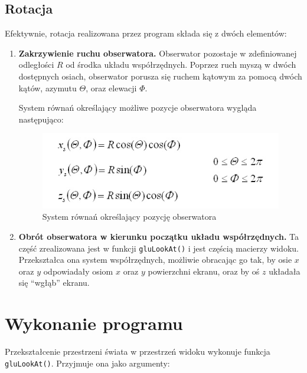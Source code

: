 \documentclass[a4paper]{article}
\begin{document}
\subsection{Rotacja}

Efektywnie, rotacja realizowana przez program składa się z dwóch elementów:

\begin{enumerate}
    \item \textbf{Zakrzywienie ruchu obserwatora.} Obserwator pozostaje w
          zdefiniowanej odległości $R$ od środka układu współrzędnych. Poprzez
          ruch myszą w dwóch dostępnych osiach, obserwator porusza się ruchem
          kątowym za pomocą dwóch kątów, azymutu $\Theta$, oraz elewacji $\Phi$.

          System równań określający możliwe pozycje obserwatora wygląda
          następująco:

          \begin{figure}[H]
              \includegraphics[width=\textwidth]{rotation-equations}
              \caption{System równań określający pozycję obserwatora}
          \end{figure}

    \item \textbf{Obrót obserwatora w kierunku początku układu współrzędnych.}
          Ta część zrealizowana jest w funkcji \verb|gluLookAt()| i jest częścią
          macierzy widoku. Przekształca ona system współrzędnych, możliwie
          obracając go tak, by osie $x$ oraz $y$ odpowiadały osiom $x$ oraz $y$
          powierzchni ekranu, oraz by oś $z$ układała się ``wgłąb'' ekranu.
\end{enumerate}

\section{Wykonanie programu}

Przekształcenie przestrzeni świata w przestrzeń widoku wykonuje funkcja
\texttt{gluLookAt()}. Przyjmuje ona jako argumenty:
\end{document}

